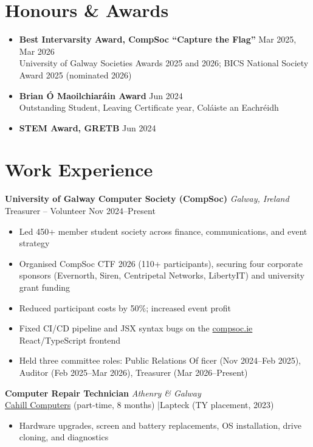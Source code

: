 \documentclass[11pt]{article}
\newcommand{\cventry}[4]{%
  \noindent\textbf{\large #1} \hfill \emph{#2}\\
  {\color{secondary}#3} \hfill {\color{secondary}#4}%
}
\begin{document}
\section*{Honours \& Awards}
\begin{itemize}[itemsep=4pt]
  \item \textbf{Best Intervarsity Award, CompSoc ``Capture the Flag''} \hfill Mar 2025, Mar 2026\\
        University of Galway Societies Awards 2025 and 2026; BICS National Society Award 2025 (nominated 2026)
  \item \textbf{Brian Ó Maoilchiaráin Award} \hfill Jun 2024\\
        Outstanding Student, Leaving Certificate year, Coláiste an Eachréidh
  \item \textbf{STEM Award, GRETB} \hfill Jun 2024
\end{itemize}

\section*{Work Experience}

\cventry{University of Galway Computer Society (CompSoc)}{Galway, Ireland}
        {Treasurer -- Volunteer}{Nov 2024--Present}
\begin{itemize}
  \item Led 450+ member student society across finance, communications, and event strategy
  \item Organised CompSoc CTF 2026 (110+ participants), securing four corporate sponsors (Evernorth, Siren, Centripetal Networks, LibertyIT) and university grant funding
  \item Reduced participant costs by 50\%; increased event profit
  \item Fixed CI/CD pipeline and JSX syntax bugs on the \href{https://compsoc.ie}{compsoc.ie} React/TypeScript frontend
  \item Held three committee roles: Public Relations Of\kern0pt ficer (Nov 2024--Feb 2025), Auditor (Feb 2025--Mar 2026), Treasurer (Mar 2026--Present)
\end{itemize}

\vspace{5pt}
\cventry{Computer Repair Technician}{Athenry \& Galway}
        {\href{https://www.cahillcomputers.com/}{Cahill Computers} (part-time, 8 months) \quad|\quad Lapteck (TY placement, 2023)}{}
\begin{itemize}
  \item Hardware upgrades, screen and battery replacements, OS installation, drive cloning, and diagnostics
\end{itemize}
\end{document}
